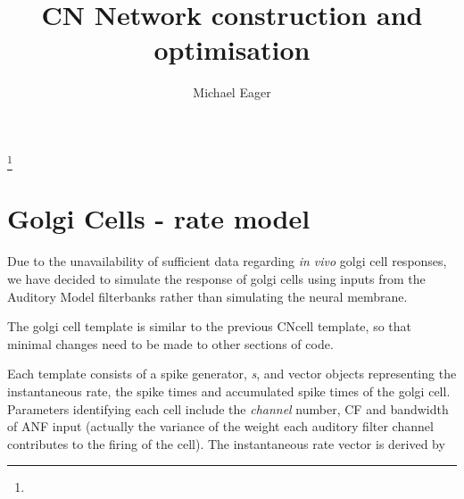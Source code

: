 \documentclass{amsart}
\theoremstyle{definition}
\theoremstyle{remark}
\numberwithin{equation}{section}
\begin{document}
\title[]{CN Network construction and optimisation}%
\author{Michael Eager}%
\address{}%
%

\thanks{}%
\subjclass{}%
\keywords{}%


\maketitle
\section{Golgi Cells - rate model}

Due to the unavailability of sufficient data regarding \emph{in vivo} golgi cell
responses, we have decided to simulate the response of golgi cells using inputs
from the Auditory Model filterbanks rather than simulating the neural membrane.

The golgi cell template is similar to the previous CNcell template, so that
minimal changes need to be made to other sections of code.

Each template consists of a spike generator, \emph{s}, and vector objects
representing the instantaneous rate, the spike times and accumulated spike times
of the golgi cell. Parameters identifying each cell include the \emph{channel}
number, CF and bandwidth of ANF input (actually the variance of the weight each
auditory filter channel contributes to the firing of the cell).  The
instantaneous rate vector is derived by
\end{document}

